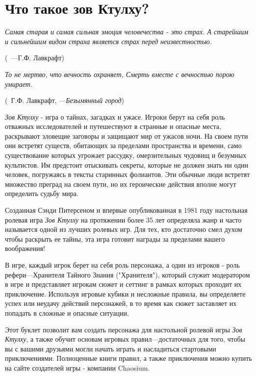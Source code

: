 \documentclass[letterpaper,twocolumn,openany, twoside, 8pt, usenames]{cocbook}
\renewenvironment{quote}{%
   \list{}{%
     \leftmargin0.0cm   %
     \rightmargin\leftmargin
   }
   \item\relax
}
{\endlist}
\let\oldquote\quote
\let\endoldquote\endquote
\renewenvironment{quote}[2][]
  {\if\relax\detokenize{#1}\relax
     \def\quoteauthor{~#2}%
   \fi
   \oldquote}
  {\par\nobreak\smallskip\hfill(\quoteauthor)%
   \endoldquote\addvspace{\bigskipamount}}
\begin{document}
\scriptsize

\section*{Что такое зов Ктулху?}
\begin{quote}{---Г.Ф. Лавкрафт}
{\it Самая старая и самая сильная эмоция человечества - это страх. А старейшим и сильнейшим видом страха является страх перед неизвестностью.}
\end{quote}

\begin{quote}{Г.Ф. Лавкрафт, ---{\it Безымянный город}}
{\it То не мертво, что вечность охраняет, Смерть вместе с вечностью порою умирает.}
\end{quote}

{\it Зов Ктулху} - игра о тайнах, загадках и ужасе. Игроки берут на себя роль отважных исследователей и путешествуют в странные и опасные места, раскрывают зловещие заговоры и защищают мир от ужасов ночи. На своем пути они встретят существ, обитающих за пределами пространства и времени, само существование которых угрожает рассудку, омерзительных чудовищ и безумных культистов. Им предстоит отыскивать секреты, которые не должен знать ни один человек, погружаясь в тексты старинных фолиантов. Эти обычные люди встретят множество преград на своем пути, но их героические действия вполне могут определить судьбу мира.

Созданная Сэнди Питерсеном и впервые опубликованная в 1981 году настольная ролевая игра {\it Зов Ктулху} на протяжении более 35 лет определяла жанр и часто называется одной из лучших ролевых игр. Для тех, кто достаточно смел духом чтобы раскрыть ее тайны, эта игра готовит награды за пределами вашего воображения!

В игре, каждый игрок берет на себя роль персонажа, а один из игроков - роль рефери---Хранителя Тайного Знания ("Хранителя"), который служит модератором в игре и представляет игрокам сюжет и сеттинг в рамках которых проходит их приключение. Используя игровые кубики и несложные правила, вы определяете успех или неудачу действий персонажей, в то время как сюжет заставляет их попадать в сложные и опасные ситуации.

Этот буклет позволит вам создать персонажа для настольной ролевой игры {\it Зов Ктулху}, а также обучит основам игровых правил---достаточных для того, чтобы вы с вашими друзьями могли начать играть и насладиться стартовыми приключениями. Полноценные книги правил, а также приключения можно купить на сайте создателей игры - компании Chaosium.
\end{document}
